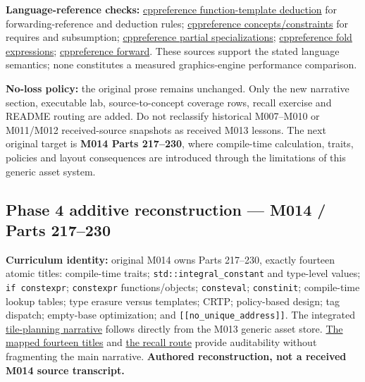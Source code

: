 \textbf{Language-reference checks:} \href{https://en.cppreference.com/w/cpp/language/template_argument_deduction}{cppreference function-template deduction} for forwarding-reference and deduction rules; \href{https://en.cppreference.com/w/cpp/language/constraints}{cppreference concepts/constraints} for requires and subsumption; \href{https://en.cppreference.com/w/cpp/language/partial_specialization}{cppreference partial specializations}; \href{https://en.cppreference.com/w/cpp/language/fold}{cppreference fold expressions}; \href{https://en.cppreference.com/w/cpp/utility/forward}{cppreference forward}. These sources support the stated language semantics; none constitutes a measured graphics-engine performance comparison.

\textbf{No-loss policy:} the original prose remains unchanged. Only the new narrative section, executable lab, source-to-concept coverage rows, recall exercise and README routing are added. Do not reclassify historical M007--M010 or M011/M012 received-source snapshots as received M013 lessons. The next original target is \textbf{M014 Parts 217--230}, where compile-time calculation, traits, policies and layout consequences are introduced through the limitations of this generic asset system.

\subsection{Phase 4 additive reconstruction --- M014 / Parts 217--230}\label{appendix-a103e7846d21-phase-4-additive-reconstruction-m014-parts-217230}

\textbf{Curriculum identity:} original M014 owns Parts 217--230, exactly fourteen atomic titles: compile-time traits; \texttt{std::integral\_constant} and type-level values; \texttt{if\ constexpr}; \texttt{constexpr} functions/objects; \texttt{consteval}; \texttt{constinit}; compile-time lookup tables; type erasure versus templates; CRTP; policy-based design; tag dispatch; empty-base optimization; and \texttt{{[}{[}no\_unique\_address{]}{]}}. The integrated \hyperref[01-foundations-i-ch005-a-texture-tile-that-chooses-its-work-before-the-frame-begins]{tile-planning narrative} follows directly from the M013 generic asset store. \hyperref[appendix-fd090d982a15-m014-parts-217230-one-tile-planner-and-its-compile-time-policy-decisions]{The mapped fourteen titles} and \hyperref[appendix-960160274237-the-tile-planner-makes-a-choice-m014-reconstruction]{the recall route} provide auditability without fragmenting the main narrative. \textbf{Authored reconstruction, not a received M014 source transcript.}

